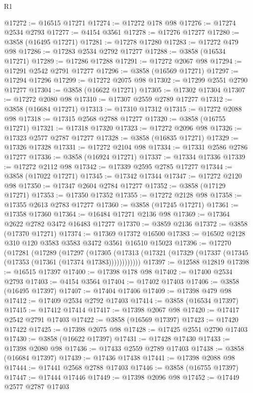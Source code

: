 \begin{lexlean}{R1}
\begin{coremodule}
@17272 := @16515 @17271
@17274 := @17272 @178 @98
@17276 := @17274 @2534 @2793
@17277 := @4154 @3561
@17278 := @17276 @17277
@17280 := @3858 (@16495 @17271)
@17281 := @17278 @17280
@17283 := @17272 @479 @98
@17286 := @17283 @2534 @2792 @17277
@17288 := @3858 (@16534 @17271)
@17289 := @17286 @17288
@17291 := @17272 @2067 @98
@17294 := @17291 @2542 @2791 @17277
@17296 := @3858 (@16569 @17271)
@17297 := @17294 @17296
@17299 := @17272 @2075 @98
@17302 := @17299 @2551 @2790 @17277
@17304 := @3858 (@16622 @17271)
@17305 := @17302 @17304
@17307 := @17272 @2080 @98
@17310 := @17307 @2559 @2789 @17277
@17312 := @3858 (@16684 @17271)
@17313 := @17310 @17312
@17315 := @17272 @2088 @98
@17318 := @17315 @2568 @2788 @17277
@17320 := @3858 (@16755 @17271)
@17321 := @17318 @17320
@17323 := @17272 @2096 @98
@17326 := @17323 @2577 @2787 @17277
@17328 := @3858 (@16835 @17271)
@17329 := @17326 @17328
@17331 := @17272 @2104 @98
@17334 := @17331 @2586 @2786 @17277
@17336 := @3858 (@16924 @17271)
@17337 := @17334 @17336
@17339 := @17272 @2112 @98
@17342 := @17339 @2595 @2785 @17277
@17344 := @3858 (@17022 @17271)
@17345 := @17342 @17344
@17347 := @17272 @2120 @98
@17350 := @17347 @2604 @2784 @17277
@17352 := @3858 (@17129 @17271)
@17353 := @17350 @17352
@17355 := @17272 @2128 @98
@17358 := @17355 @2613 @2783 @17277
@17360 := @3858 (@17245 @17271)
@17361 := @17358 @17360
@17364 := @16484 @17271 @2136 @98
@17369 := @17364 @2622 @2782 @3472 @16483 @17277
@17370 := @3859 @2136
@17372 := @3858 (@17370 @17271)
@17374 := @17369 @17372 @16500
@17383 := @16502 @2128 @310 @120 @3583 @3583 @3472 @3561 @16510 @15023
@17396 := @17270
    (@17281
      (@17289
        (@17297
          (@17305 (@17313 (@17321 (@17329 (@17337 (@17345 (@17353 (@17361 (@17374 @17383))))))))))))
@17397 := @12588 @12819
@17398 := @16515 @17397
@17400 := @17398 @178 @98
@17402 := @17400 @2534 @2793
@17403 := @4154 @3564
@17404 := @17402 @17403
@17406 := @3858 (@16495 @17397)
@17407 := @17404 @17406
@17409 := @17398 @479 @98
@17412 := @17409 @2534 @2792 @17403
@17414 := @3858 (@16534 @17397)
@17415 := @17412 @17414
@17417 := @17398 @2067 @98
@17420 := @17417 @2542 @2791 @17403
@17422 := @3858 (@16569 @17397)
@17423 := @17420 @17422
@17425 := @17398 @2075 @98
@17428 := @17425 @2551 @2790 @17403
@17430 := @3858 (@16622 @17397)
@17431 := @17428 @17430
@17433 := @17398 @2080 @98
@17436 := @17433 @2559 @2789 @17403
@17438 := @3858 (@16684 @17397)
@17439 := @17436 @17438
@17441 := @17398 @2088 @98
@17444 := @17441 @2568 @2788 @17403
@17446 := @3858 (@16755 @17397)
@17447 := @17444 @17446
@17449 := @17398 @2096 @98
@17452 := @17449 @2577 @2787 @17403

\end{coremodule}
\end{lexlean}
